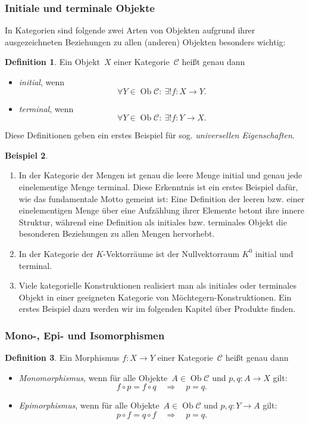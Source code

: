 \documentclass[a4paper,ngerman]{scrartcl}
\theoremstyle{definition}
\newtheorem{defn}{Definition}[section]
\newtheorem{bsp}[defn]{Beispiel}
\theoremstyle{plain}
\theoremstyle{remark}
\newcommand{\C}{\mathcal{C}}
\DeclareMathOperator{\Ob}{Ob}
\begin{document}
\subsubsection*{Initiale und terminale Objekte}

In Kategorien sind folgende zwei Arten von Objekten aufgrund ihrer
ausgezeichneten Beziehungen zu allen (anderen) Objekten besonders wichtig:
\begin{defn}
Ein Objekt~$X$ einer Kategorie~$\C$ heißt genau dann
\begin{itemize}
  \item \emph{initial}, wenn
    \[ \forall Y \in \Ob \C{:}\ \exists! f : X \to Y. \]
  \item \emph{terminal}, wenn
    \[ \forall Y \in \Ob \C{:}\ \exists! f : Y \to X. \]
\end{itemize}
\end{defn}
Diese Definitionen geben ein erstes Beispiel für sog. \emph{universellen
Eigenschaften}.

\begin{bsp}\begin{enumerate}
\item In der Kategorie der Mengen ist genau die leere Menge initial und
genau jede einelementige Menge terminal. Diese Erkenntnis ist ein erstes
Beispiel dafür, wie das fundamentale Motto gemeint ist: Eine Definition der
leeren bzw. einer einelementigen Menge über eine Aufzählung ihrer Elemente
betont ihre innere Struktur, während eine Definition als initiales bzw.
terminales Objekt die besonderen Beziehungen zu allen Mengen hervorhebt.
\item In der Kategorie der $K$-Vektorräume ist der Nullvektorraum $K^0$ initial
und terminal.
\item Viele kategorielle Konstruktionen realisiert man als initiales oder
terminales Objekt in einer geeigneten Kategorie von Möchtegern-Konstruktionen.
Ein erstes Beispiel dazu werden wir im folgenden Kapitel über Produkte finden.
\end{enumerate}\end{bsp}


\subsubsection*{Mono-, Epi- und Isomorphismen}

\begin{defn}
Ein Morphismus $f:X \to Y$ einer Kategorie~$\C$ heißt genau dann
\begin{itemize}
  \item \emph{Monomorphismus}, \tabto{3.35cm}wenn für alle Objekte~$A \in \Ob \C$
  und $p,q:A \to X$ gilt:
  \[ f \circ p = f \circ q \quad\Longrightarrow\quad p = q. \]
  \item \emph{Epimorphismus}, \tabto{3.35cm}wenn für alle Objekte~$A \in \Ob \C$
  und $p,q:Y \to A$ gilt:
  \[ p \circ f = q \circ f \quad\Longrightarrow\quad p = q. \]
\end{itemize}
\end{defn}
\end{document}
